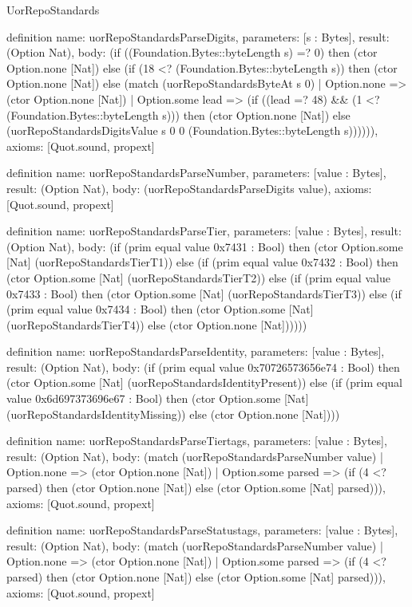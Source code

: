 \begin{lexlean}{UorRepoStandards}
\begin{semanticmodule}
definition{
  name: uorRepoStandardsParseDigits,
  parameters: [s : Bytes],
  result: (Option Nat),
  body: (if ((Foundation.Bytes::byteLength s) =? 0) then (ctor Option.none [Nat]) else (if (18 <? (Foundation.Bytes::byteLength s)) then (ctor Option.none [Nat]) else (match (uorRepoStandardsByteAt s 0)
    | Option.none => (ctor Option.none [Nat])
    | Option.some lead => (if ((lead =? 48) && (1 <? (Foundation.Bytes::byteLength s))) then (ctor Option.none [Nat]) else (uorRepoStandardsDigitsValue s 0 0 (Foundation.Bytes::byteLength s)))))),
  axioms: [Quot.sound, propext]
}

definition{
  name: uorRepoStandardsParseNumber,
  parameters: [value : Bytes],
  result: (Option Nat),
  body: (uorRepoStandardsParseDigits value),
  axioms: [Quot.sound, propext]
}

definition{
  name: uorRepoStandardsParseTier,
  parameters: [value : Bytes],
  result: (Option Nat),
  body: (if (prim equal value 0x7431 : Bool) then (ctor Option.some [Nat] (uorRepoStandardsTierT1)) else (if (prim equal value 0x7432 : Bool) then (ctor Option.some [Nat] (uorRepoStandardsTierT2)) else (if (prim equal value 0x7433 : Bool) then (ctor Option.some [Nat] (uorRepoStandardsTierT3)) else (if (prim equal value 0x7434 : Bool) then (ctor Option.some [Nat] (uorRepoStandardsTierT4)) else (ctor Option.none [Nat])))))
}

definition{
  name: uorRepoStandardsParseIdentity,
  parameters: [value : Bytes],
  result: (Option Nat),
  body: (if (prim equal value 0x70726573656e74 : Bool) then (ctor Option.some [Nat] (uorRepoStandardsIdentityPresent)) else (if (prim equal value 0x6d697373696e67 : Bool) then (ctor Option.some [Nat] (uorRepoStandardsIdentityMissing)) else (ctor Option.none [Nat])))
}

definition{
  name: uorRepoStandardsParseTiertags,
  parameters: [value : Bytes],
  result: (Option Nat),
  body: (match (uorRepoStandardsParseNumber value)
    | Option.none => (ctor Option.none [Nat])
    | Option.some parsed => (if (4 <? parsed) then (ctor Option.none [Nat]) else (ctor Option.some [Nat] parsed))),
  axioms: [Quot.sound, propext]
}

definition{
  name: uorRepoStandardsParseStatustags,
  parameters: [value : Bytes],
  result: (Option Nat),
  body: (match (uorRepoStandardsParseNumber value)
    | Option.none => (ctor Option.none [Nat])
    | Option.some parsed => (if (4 <? parsed) then (ctor Option.none [Nat]) else (ctor Option.some [Nat] parsed))),
  axioms: [Quot.sound, propext]
}


\end{semanticmodule}
\end{lexlean}
